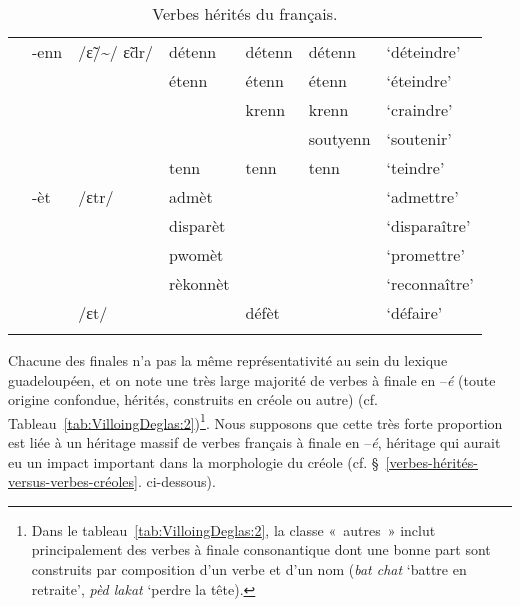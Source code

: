 \documentclass[output=paper]{langsci/langscibook}
\begin{document}
\begin{table}
{\begin{tabular}[c]{lllllll}
  \cline{2-7}
  & -enn & /ɛ̃/\textasciitilde{}/ ɛ̃dr/ & détenn  & détenn
 & détenn &`déteindre'\\
  & & & étenn  & étenn & étenn
  & `éteindre'\\
  & & & & krenn & krenn &`craindre'\\
  & & & & & soutyenn &`soutenir'\\
  & & & tenn & tenn & tenn &`teindre'\\

  \cline{2-7}
  & -èt & /ɛtr/ & admèt  & & & `admettre'\\
  & & & disparèt  & & & `disparaître'\\
  & & & pwomèt  & & & `promettre'\\
  & & & rèkonnèt  & & & `reconnaître'\\
  & & /ɛt/ & & défèt  & & `défaire'\\
  \lspbottomrule
\end{tabular}}
\caption{Verbes hérités du français.}
\label{tab:VilloingDeglas:1}
\end{table}


Chacune des finales n'a pas la même représentativité au sein du lexique
guadeloupéen, et on note une très large majorité de verbes à finale en
--\emph{é} (toute origine confondue, hérités, construits en créole ou
autre) (cf. Tableau~\ref{tab:VilloingDeglas:2})\footnote{Dans le tableau~\ref{tab:VilloingDeglas:2}, la classe «~autres~» inclut principalement des verbes à
    finale consonantique dont une bonne part sont construits par
    composition d'un verbe et d'un nom (\emph{bat chat} `battre en
    retraite', \emph{pèd lakat} `perdre la tête).}. Nous supposons que cette très forte proportion
est liée à un héritage massif de verbes français à finale en --\emph{é},
héritage qui aurait eu un impact important dans la morphologie du créole
(cf. §~\ref{verbes-hérités-versus-verbes-créoles}. ci-dessous).
\end{document}
